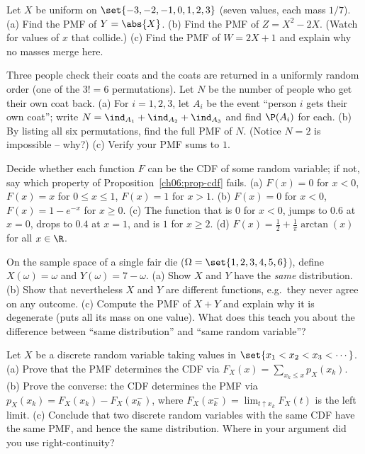 \begin{exercise}
\label{ch06:ex-transform}
Let $X$ be uniform on $\set{-3,-2,-1,0,1,2,3}$ (seven values, each mass $1/7$).
(a) Find the PMF of $Y = \abs{X}$. (b) Find the PMF of $Z = X^2 - 2X$. (Watch for
values of $x$ that collide.) (c) Find the PMF of $W = 2X + 1$ and explain why no masses
merge here.
\end{exercise}

\begin{exercise}
\label{ch06:ex-fixed-points}
Three people check their coats and the coats are returned in a uniformly random order
(one of the $3! = 6$ permutations). Let $N$ be the number of people who get their own
coat back. (a) For $i = 1,2,3$, let $A_i$ be the event ``person $i$ gets their own
coat''; write $N = \ind_{A_1} + \ind_{A_2} + \ind_{A_3}$ and find $\P(A_i)$ for each.
(b) By listing all six permutations, find the full PMF of $N$. (Notice $N = 2$ is
impossible -- why?) (c) Verify your PMF sums to $1$.
\end{exercise}

\begin{exercise}
\label{ch06:ex-cdf-concept}
Decide whether each function $F$ can be the CDF of some random variable; if not, say
which property of Proposition~\ref{ch06:prop-cdf} fails.
(a) $F(x) = 0$ for $x<0$, $F(x) = x$ for $0 \le x \le 1$, $F(x) = 1$ for $x > 1$.
(b) $F(x) = 0$ for $x < 0$, $F(x) = 1 - e^{-x}$ for $x \ge 0$.
(c) The function that is $0$ for $x<0$, jumps to $0.6$ at $x=0$, drops to $0.4$ at
$x=1$, and is $1$ for $x \ge 2$.
(d) $F(x) = \tfrac{1}{2} + \tfrac{1}{\pi}\arctan(x)$ for all $x \in \R$.
\end{exercise}

\begin{exercise}
\label{ch06:ex-same-dist-diff-fn}
On the sample space of a single fair die ($\Omega = \set{1,2,3,4,5,6}$), define
$X(\omega) = \omega$ and $Y(\omega) = 7 - \omega$. (a) Show $X$ and $Y$ have the
\emph{same} distribution. (b) Show that nevertheless $X$ and $Y$ are different
functions, e.g.\ they never agree on any outcome. (c) Compute the PMF of $X + Y$ and
explain why it is degenerate (puts all its mass on one value). What does this teach you
about the difference between ``same distribution'' and ``same random variable''?
\end{exercise}

\begin{exercise}
\label{ch06:ex-proof-cdf-pmf}
Let $X$ be a discrete random variable taking values in
$\set{x_1 < x_2 < x_3 < \cdots}$. (a) Prove that the PMF determines the CDF via
$F_X(x) = \sum_{x_k \le x} p_X(x_k)$. (b) Prove the converse: the CDF determines the
PMF via $p_X(x_k) = F_X(x_k) - F_X(x_{k}^-)$, where $F_X(x_k^-) = \lim_{t \uparrow x_k}
F_X(t)$ is the left limit. (c) Conclude that two discrete random variables with the
same CDF have the same PMF, and hence the same distribution. Where in your argument did
you use right-continuity?
\end{exercise}

